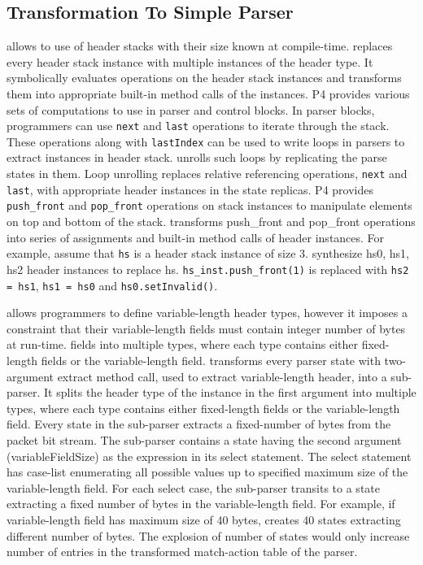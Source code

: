 \documentclass[letterpaper,twocolumn,10pt]{article}
\begin{document}
\subsection{Transformation To Simple Parser}
\label{subsection:header-stacks-variable-length-headers}
\ulang allows to use of header stacks with their size known at 
compile-time. 
\ucomp replaces every header stack instance with multiple instances of 
the header type. 
It symbolically evaluates operations on the header stack instances and 
transforms them into appropriate built-in method calls of the 
instances.
P4 provides various sets of computations to use in parser and control 
blocks.
In parser blocks, programmers can use \texttt{next} and \texttt{last} 
operations to iterate through the stack.
These operations along with \texttt{lastIndex} can be used to write 
loops in parsers to extract instances in header stack.
\ucomp unrolls such loops by replicating the parse states in them.
Loop unrolling replaces relative referencing operations, \texttt{next} 
and \texttt{last}, with appropriate header instances in the state 
replicas.
P4 provides \texttt{push\_front} and \texttt{pop\_front} operations on 
stack instances to manipulate elements on top and bottom of the stack.
\ucomp transforms push\_front and pop\_front operations into series of 
assignments and built-in method calls of header instances.
For example, assume that \texttt{hs} is a header stack instance of 
size 3. 
\ucomp synthesize hs0, hs1, hs2 header instances to replace hs.
\texttt{hs\_inst.push\_front(1)} is replaced with \texttt{hs2 = hs1}, 
\texttt{hs1 = hs0} and \texttt{hs0.setInvalid()}.


\ulang allows programmers to define variable-length header types, 
however it imposes a constraint that their variable-length fields must 
contain integer number of bytes at run-time.
fields into multiple types, where each type contains either 
fixed-length fields or the variable-length field.
\ucomp transforms every parser state with two-argument extract method 
call, used to extract variable-length header, into a sub-parser.
It splits the header type of the instance in the first argument into 
multiple types, where each type contains either fixed-length fields or 
the variable-length field.
Every state in the sub-parser extracts a fixed-number of bytes from 
the packet bit stream.
The sub-parser contains a state having the second argument 
(variableFieldSize) as the expression in its select statement.
The select statement has case-list enumerating all possible values up 
to specified maximum size of the variable-length field.
For each select case, the sub-parser transits to a state extracting a 
fixed number of bytes in the variable-length field.
For example, if variable-length field has maximum size of 40 bytes, 
\ucomp creates 40 states extracting different number of bytes.
The explosion of number of states would only increase number of 
entries in the transformed match-action table of the parser.
\end{document}
